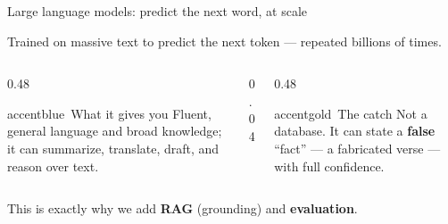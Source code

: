 \begin{frame}{Large language models: predict the next word, at scale}
  \begin{center}
  \end{center}
  \vspace{2pt}
  \begin{center}\footnotesize\color{midgray}Trained on massive text to predict the next token --- repeated billions of times.\end{center}
  \vspace{6pt}
  \begin{columns}[t,totalwidth=\textwidth]
    \begin{column}{0.48\textwidth}
      \begin{featbox}{accentblue}{\faCheckCircle\ What it gives you}
        \scriptsize Fluent, general language and broad knowledge; it can summarize,
        translate, draft, and reason over text.
      \end{featbox}
    \end{column}
    \begin{column}{0.04\textwidth}\end{column}
    \begin{column}{0.48\textwidth}
      \begin{featbox}{accentgold}{\faExclamationTriangle\ The catch}
        \scriptsize Not a database. It can state a \textbf{false} ``fact'' --- a
        fabricated verse --- with full confidence.
      \end{featbox}
    \end{column}
  \end{columns}
  \vspace{6pt}
  \begin{center}\small\color{labnavy}This is exactly why we add
    \textcolor{cRAG}{\textbf{RAG}} (grounding) and
    \textcolor{cEval}{\textbf{evaluation}}.\end{center}
\end{frame}

